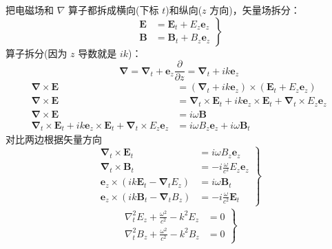 把电磁场和 $\nabla$ 算子都拆成横向(下标 $t$)和纵向($z$ 方向)，矢量场拆分：
\begin{equation}
\left.\begin{aligned}
\boldsymbol{E} &= \boldsymbol{E}_t + E_z \boldsymbol{e}_z\\
\boldsymbol{B} &= \boldsymbol{B}_t + B_z \boldsymbol{e}_z
\end{aligned}\right\}
\end{equation}
算子拆分(因为 $z$ 导数就是 $ik$)：
\begin{equation}
    \boldsymbol\nabla = \boldsymbol\nabla_t + \boldsymbol{e}_z \frac{\partial}{\partial z} = \boldsymbol\nabla_t + i k \boldsymbol{e}_z
\end{equation}
\begin{align}
    \boldsymbol\nabla \times \boldsymbol E &= \left(\boldsymbol\nabla_t + i k \boldsymbol{e}_z\right) \times (\boldsymbol{E}_t + E_z \boldsymbol{e}_z)\nonumber\\
    \boldsymbol\nabla \times \boldsymbol E &= \boldsymbol\nabla_t\times \boldsymbol{E}_t
    +i k \boldsymbol{e}_z\times \boldsymbol{E}_t 
    +\boldsymbol{\nabla}_t  \times E_z \boldsymbol{e}_z\\
    \boldsymbol\nabla \times \boldsymbol{E} &= i\omega\boldsymbol{B}\\
    \boldsymbol\nabla_t\times \boldsymbol{E}_t
    +i k \boldsymbol{e}_z\times \boldsymbol{E}_t 
    +\boldsymbol{\nabla}_t  \times E_z \boldsymbol{e}_z&= i \omega B_z \boldsymbol{e}_z + i \omega \boldsymbol{B}_t
\end{align}
对比两边根据矢量方向
\begin{equation}
\left.\begin{aligned}
\boldsymbol\nabla_t \times \boldsymbol{E}_t &= i \omega B_z \boldsymbol{e}_z\\
\boldsymbol\nabla_t \times \boldsymbol{B}_t &= -i \frac{\omega}{c^2} E_z \boldsymbol{e}_z\\
\boldsymbol{e}_z \times (i k \boldsymbol{E}_t - \boldsymbol\nabla_t E_z) &= i \omega \boldsymbol{B}_t\\
\boldsymbol{e}_z \times (i k \boldsymbol{B}_t - \boldsymbol\nabla_t B_z) &= -i \frac{\omega}{c^2} \boldsymbol{E}_t
\end{aligned}\right\}
\end{equation}
\begin{align}
    \left.\begin{aligned}
    \nabla_t^2E_z+\frac{\omega^2}{c^2}-k^2E_z&=0\\
    \nabla_t^2B_z+\frac{\omega^2}{c^2}-k^2B_z&=0
\end{aligned}\right\}
\end{align}
